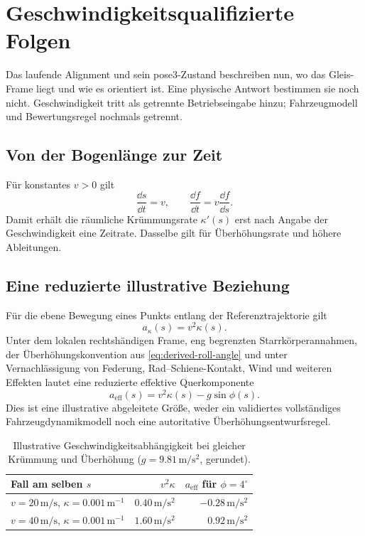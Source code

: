 \chapter{Geschwindigkeitsqualifizierte Folgen}

Das laufende Alignment und sein pose3-Zustand beschreiben nun, wo das
Gleis-Frame liegt und wie es orientiert ist. Eine physische Antwort bestimmen
sie noch nicht. Geschwindigkeit tritt als getrennte Betriebseingabe hinzu;
Fahrzeugmodell und Bewertungsregel nochmals getrennt.

\section{Von der Bogenlänge zur Zeit}

Für konstantes \(v>0\) gilt
\[
\frac{\dd s}{\dd t}=v,
\qquad
\frac{\dd f}{\dd t}=v\frac{\dd f}{\dd s}.
\]
Damit erhält die räumliche Krümmungsrate \(\kappa'(s)\) erst nach Angabe der
Geschwindigkeit eine Zeitrate. Dasselbe gilt für Überhöhungsrate und höhere
Ableitungen.

\section{Eine reduzierte illustrative Beziehung}

Für die ebene Bewegung eines Punkts entlang der Referenztrajektorie gilt
\[
a_\kappa(s)=v^2\kappa(s).
\]
Unter dem lokalen rechtshändigen Frame, eng begrenzten
Starrkörperannahmen, der Überhöhungskonvention aus
\cref{eq:derived-roll-angle} und unter Vernachlässigung von Federung,
Rad--Schiene-Kontakt, Wind und weiteren Effekten lautet eine reduzierte
effektive Querkomponente
\[
a_{\mathrm{eff}}(s)=v^2\kappa(s)-g\sin\phi(s).
\]
Dies ist eine illustrative abgeleitete Größe, weder ein validiertes
vollständiges Fahrzeugdynamikmodell noch eine autoritative
Überhöhungsentwurfsregel.

\begin{table}[htbp]
\centering
\small
\begin{tabular}{lrr}
\toprule
Fall am selben \(s\) & \(v^2\kappa\) & \(a_{\mathrm{eff}}\) für \(\phi=4^\circ\)\\
\midrule
\(v=20\,\mathrm{m/s}\), \(\kappa=0.001\,\mathrm{m^{-1}}\) & \(0.40\,\mathrm{m/s^2}\) & \(-0.28\,\mathrm{m/s^2}\)\\
\(v=40\,\mathrm{m/s}\), \(\kappa=0.001\,\mathrm{m^{-1}}\) & \(1.60\,\mathrm{m/s^2}\) & \(0.92\,\mathrm{m/s^2}\)\\
\bottomrule
\end{tabular}
\caption{Illustrative Geschwindigkeitsabhängigkeit bei gleicher Krümmung und Überhöhung (\(g=9.81\,\mathrm{m/s^2}\), gerundet).}
\label{tab:same-curvature-two-speeds}
\end{table}

